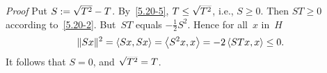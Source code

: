 \documentclass[main.tex]{subfiles}
\begin{document}
\begin{psec}{5.20}
\begin{enumerate}
\noindent \emph{Proof} Put $S:=\smash{\sqrt{T^2}}-T$.
By~\ref{5.20-5}, $T\leq \smash{\sqrt{T^2}}$,
i.e., $S\geq 0$.
Then $ST\geq 0$ according to~\ref{5.20-2}.
But~$ST$ equals $-\frac{1}{2} S^2$.
Hence for all~$x$ in~$H$
\begin{equation*}
\|Sx\|^2 = \left<Sx,Sx\right>=\left<S^2 x,x\right>
=-2\left<STx,x\right>\leq 0\text{.}
\end{equation*}
It follows that $S=0$, and $\smash{\sqrt{T^2}}=T$. \xqed
\end{enumerate}
\end{psec}
\end{document}
